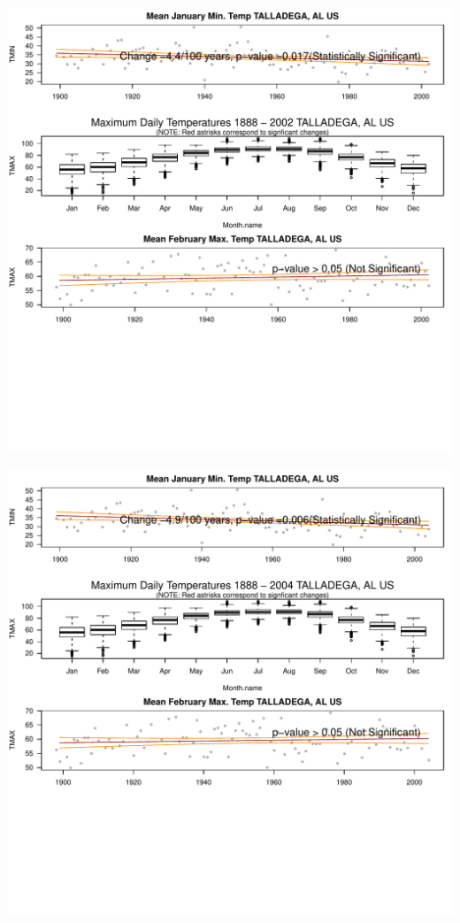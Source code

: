 \documentclass{article}\usepackage[]{graphicx}\usepackage[]{color}
\makeatletter
\def\maxwidth{ %
  \ifdim\Gin@nat@width>\linewidth
    \linewidth
  \else
    \Gin@nat@width
  \fi
}
\newenvironment{knitrout}{}{} %
\makeatother
\begin{document}
\begin{knitrout}
\includegraphics[width=\maxwidth]{figure/static_template-47} 

\includegraphics[width=\maxwidth]{figure/static_template-48} 


\end{knitrout}
\end{document}
